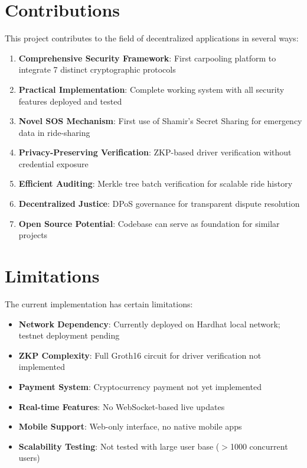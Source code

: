 \section{Contributions}

This project contributes to the field of decentralized applications in several ways:

\begin{enumerate}
    \item \textbf{Comprehensive Security Framework}: First carpooling platform to integrate 7 distinct cryptographic protocols
    
    \item \textbf{Practical Implementation}: Complete working system with all security features deployed and tested
    
    \item \textbf{Novel SOS Mechanism}: First use of Shamir's Secret Sharing for emergency data in ride-sharing
    
    \item \textbf{Privacy-Preserving Verification}: ZKP-based driver verification without credential exposure
    
    \item \textbf{Efficient Auditing}: Merkle tree batch verification for scalable ride history
    
    \item \textbf{Decentralized Justice}: DPoS governance for transparent dispute resolution
    
    \item \textbf{Open Source Potential}: Codebase can serve as foundation for similar projects
\end{enumerate}

\section{Limitations}

The current implementation has certain limitations:

\begin{itemize}
    \item \textbf{Network Dependency}: Currently deployed on Hardhat local network; testnet deployment pending
    \item \textbf{ZKP Complexity}: Full Groth16 circuit for driver verification not implemented
    \item \textbf{Payment System}: Cryptocurrency payment not yet implemented
    \item \textbf{Real-time Features}: No WebSocket-based live updates
    \item \textbf{Mobile Support}: Web-only interface, no native mobile apps
    \item \textbf{Scalability Testing}: Not tested with large user base ($>$1000 concurrent users)
\end{itemize}

